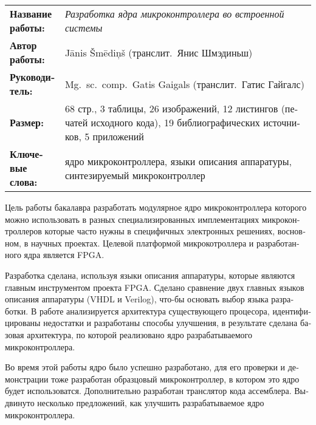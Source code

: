 \begin{english}
	
\end{english}

\clearpage
\begin{russian} %
	\abstitlestyle{\abstractname} %
	\noindent%
	\begin{tabularx}{\textwidth}{lX}
		\textbf{Название работы:} & 
			\textit{Разработка ядра микроконтроллера во встроенной системы}\\[1ex]
		\textbf{Автор работы:} & Jānis Šmēdiņš (транслит.~Янис Шмэдиньш)\\[1ex]
		\textbf{Руководитель:} & Mg.~sc.~comp.~Gatis Gaigals 
			(транслит.~Гатис Гайгалс)\\[1ex]
		\textbf{Размер:} & 68 стр., 3 таблицы, 26 изображений,
			12 листингов (печатей исходного кода), 19 библиографических источников, 5 приложений\\[1ex]
		\textbf{Ключевые слова:} & ядро микроконтроллера,
			языки описания аппаратуры, синтезируемый микроконтроллер
	\end{tabularx}
	
	
	Цель работы бакалавра разработать модулярное ядро микроконтроллера
	которого можно использовать в разных специализированных имплементациях
	микроконтроллеров которые часто нужны в специфичных электронных решениях,
	восновном, в научных проектах. Целевой платформой микрокотроллера и
	разработанного ядра является FPGA.

	Разработка сделана, используя языки описания аппаратуры, которые
	являются главным инструментом проекта FPGA. Сделано сравнение двух
	главных языков описания аппаратуры (VHDL и Verilog), что-бы основать
	выбор языка разработки. В работе анализируется архитектура существующего
	процесора, идентифицированы недостатки и разработаны способы улучшения,
	в результате сделана базовая архитектура, по которой реализовано
	ядро разрабатываемого микроконтроллера.

	Во время этой работы ядро было успешно разработано, для его
	проверки и демонстрации  тоже разработан образцовый микроконтроллер,
	в котором это ядро будет использоватся. Дополнительно разработан
	транслятор кода ассемблера. Выдвинуто несколько предложений,
	как улучшить разрабатываемое ядро микроконтроллера.
	
\end{russian}
